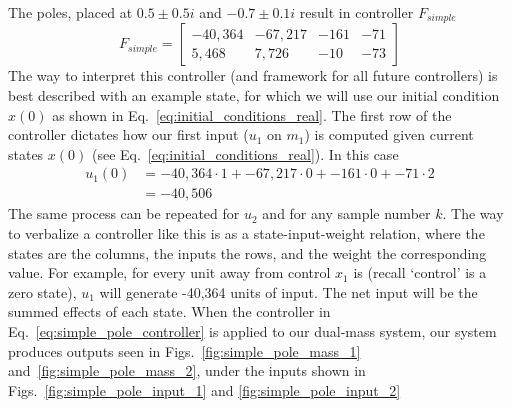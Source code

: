 The poles, placed at $0.5 \pm 0.5i$ and $-0.7 \pm 0.1i$ result in controller $F_{simple}$
\begin{equation}
    F_{simple} = 
    \begin{bmatrix}
        -40,364&-67,217&-161&-71\\5,468&7,726&-10&-73
    \end{bmatrix}
    \label{eq:simple_pole_controller}
\end{equation}
The way to interpret this controller (and framework for all future controllers) is best described with an example state, for which we will use our initial condition $x\left(0\right)$ as shown in Eq.~\ref{eq:initial_conditions_real}. The first row of the controller dictates how our first input ($u_1$ on $m_1$) is computed given current states $x(0)$ (see Eq.~\ref{eq:initial_conditions_real}). In this case
\begin{equation}
    \begin{split}
        u_1\left(0\right)&=-40,364\cdot1+-67,217\cdot0+-161\cdot0+-71\cdot2\\
        &=-40,506
    \end{split}
    \label{eq:example_control_use_u0}
\end{equation}
The same process can be repeated for $u_2$ and for any sample number $k$. The way to verbalize a controller like this is as a state-input-weight relation, where the states are the columns, the inputs the rows, and the weight the corresponding value. For example, for every unit away from control $x_1$ is (recall `control' is a zero state), $u_1$ will generate -40,364 units of input. The net input will be the summed effects of each state.
When the controller in Eq.~\ref{eq:simple_pole_controller} is applied to our dual-mass system, our system produces outputs seen in Figs.~\ref{fig:simple_pole_mass_1} and~\ref{fig:simple_pole_mass_2}, under the inputs shown in Figs.~\ref{fig:simple_pole_input_1} and {\ref{fig:simple_pole_input_2}}

